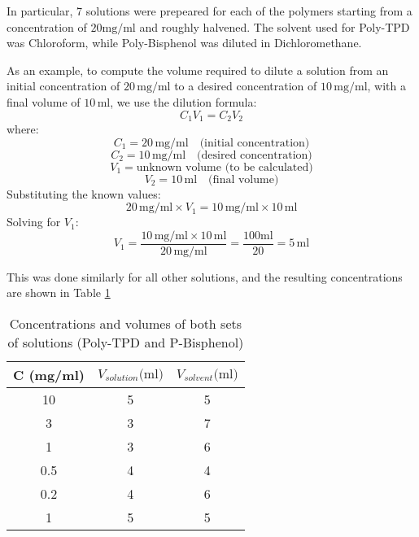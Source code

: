 In particular, 7 solutions were prepeared for each of the polymers starting from a concentration of $20 \text{mg/ml}$ %
and roughly halvened.
The solvent used for Poly-TPD was Chloroform, while Poly-Bisphenol was diluted in Dichloromethane.

As an example, to compute the volume required to dilute a solution from an initial concentration of \( 20 \, \text{mg/ml} \) to a desired concentration of \( 10 \, \text{mg/ml} \), with a final volume of \( 10 \, \text{ml} \), we use the dilution formula:
\[
C_1 V_1 = C_2 V_2
\]
where:
\[
C_1 = 20 \, \text{mg/ml} \quad \text{(initial concentration)}
\]
\[
C_2 = 10 \, \text{mg/ml} \quad \text{(desired concentration)}
\]
\[
V_1 = \text{unknown volume (to be calculated)}
\]
\[
V_2 = 10 \, \text{ml} \quad \text{(final volume)}
\]
Substituting the known values:
\[
20 \, \text{mg/ml} \times V_1 = 10 \, \text{mg/ml} \times 10 \, \text{ml}
\]
Solving for \( V_1 \):
\[
	V_1 = \frac{10 \, \text{mg/ml} \times 10 \, \text{ml}}{20 \, \text{mg/ml}} = \frac{100 \text{ml}}{20} = 5 \, \text{ml}
\]

This was done similarly for all other solutions, and the resulting concentrations are shown in Table \ref{tab:solution-concentrations}

\begin{table}[]
	\caption{Concentrations and volumes of both sets of solutions (Poly-TPD and P-Bisphenol)}
\label{tab:solution-concentrations}
\begin{center}
\begin{tabular}{@{}ccc@{}}
\toprule
C (mg/ml) & $V_{solution}\text{(ml)}$ & $V_{solvent}\text{(ml)}$ \\ \midrule
10                    & 5           & 5          \\ \midrule
3                     & 3           & 7          \\ \midrule
1                     & 3           & 6          \\ \midrule
0.5                   & 4           & 4          \\ \midrule
0.2                   & 4           & 6          \\ \midrule
1                     & 5           & 5          \\ \bottomrule
\end{tabular}
\end{center}
\end{table}

